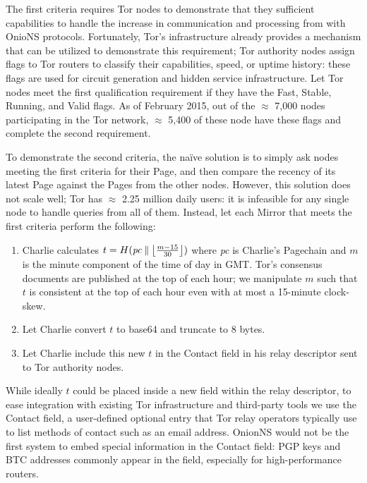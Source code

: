 The first criteria requires Tor nodes to demonstrate that they sufficient capabilities to handle the increase in communication and processing from with OnioNS protocols. Fortunately, Tor's infrastructure already provides a mechanism that can be utilized to demonstrate this requirement; Tor authority nodes assign flags to Tor routers to classify their capabilities, speed, or uptime history: these flags are used for circuit generation and hidden service infrastructure. Let Tor nodes meet the first qualification requirement if they have the Fast, Stable, Running, and Valid flags. As of February 2015, out of the $ \approx $ 7,000 nodes participating in the Tor network, $ \approx $ 5,400 of these node have these flags and complete the second requirement.\cite{TorMetrics}

To demonstrate the second criteria, the na\"{i}ve solution is to simply ask nodes meeting the first criteria for their Page, and then compare the recency of its latest Page against the Pages from the other nodes. However, this solution does not scale well; Tor has $ \approx $ 2.25 million daily users\cite{TorMetrics}: it is infeasible for any single node to handle queries from all of them. Instead, let each Mirror that meets the first criteria perform the following:

\begin{enumerate}
	\item Charlie calculates $ t = H(\mathit{pc} \concat \floor[\big]{\frac{m - 15}{30}}) $ where \emph{pc} is Charlie's Pagechain and $ m $ is the minute component of the time of day in GMT. Tor's consensus documents are published at the top of each hour; we manipulate $ m $ such that $ t $ is consistent at the top of each hour even with at most a 15-minute clock-skew.
	\item Let Charlie convert $ t $ to base64 and truncate to 8 bytes.
	\item Let Charlie include this new $ t $ in the Contact field in his relay descriptor sent to Tor authority nodes.
\end{enumerate}

While ideally $ t $ could be placed inside a new field within the relay descriptor, to ease integration with existing Tor infrastructure and third-party tools we use the Contact field, a user-defined optional entry that Tor relay operators typically use to list methods of contact such as an email address. OnionNS would not be the first system to embed special information in the Contact field: PGP keys and BTC addresses commonly appear in the field, especially for high-performance routers.

